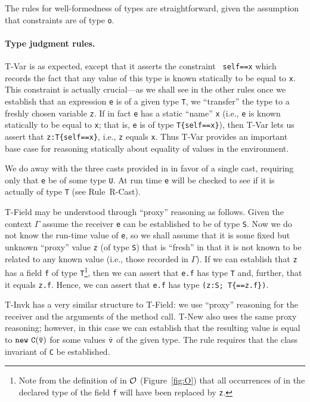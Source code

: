 The rules for well-formedness of types are straightforward, given 
the assumption that constraints are of type {\tt o}.

\paragraph{Type judgment rules.}
{\sc T-Var} is as expected, except that it asserts the constraint {\tt
self==x} which records the fact that any value of this type is known
statically to be equal to {\tt x}. This constraint is actually 
crucial---as we shall see in the other rules once we establish that
an expression {\tt e} is of a given type {\tt T}, we ``transfer'' the
type to a freshly chosen variable {\tt z}. If in fact {\tt e} has a
static ``name'' {\tt x} (i.e., {\tt e} is known statically to be
equal to {\tt x}; that is, {\tt e} is of type {\tt T\{self==x\}}), then
{\sc T-Var} lets us assert that {\tt z:T\{self==x\}}, i.e., {\tt z}
equals {\tt x}. Thus {\sc T-Var} provides an important base case for
reasoning statically about equality of values in the environment.

We do away with the three casts provided in \FJ{} in favor of a single
cast, requiring only that {\tt e} be of some type {\tt U}. At run time
{\tt e} will be checked to see if it is actually of type {\tt T} (see
Rule~{\sc R-Cast}).

{\sc T-Field} may be understood through ``proxy'' reasoning as
follows.  Given the context $\Gamma$ assume the receiver {\tt e} can
be established to be of type {\tt S}. Now we do not know the run-time
value of {\tt e}, so we shall assume that it is some fixed but unknown
``proxy'' value {\tt z} (of type {\tt S}) that is ``fresh'' in that it
is not known to be related to any known value (i.e., those recorded
in $\Gamma$).  If we can establish that {\tt z} has a field {\tt f} of
type {\tt T}\footnote{Note from the definition of \fields{} in
${\cal O}$ (Figure~\ref{fig:O}) that all occurrences of \this{}
in the declared type of the field {\tt f} will have been
replaced by {\tt z}.}, then we can assert that {\tt e.f} has
type {\tt T} and, further, that it equals {\tt z.f}.  Hence, we
can assert that {\tt e.f} has type {\tt (z:S;\,T\{\self==z.f\})}.

{\sc T-Invk} has a very similar structure to {\sc T-Field}: we use
``proxy'' reasoning for the receiver and the arguments of the method
call. {\sc T-New} also uses the same proxy reasoning; however, in this case
we can establish that the resulting value is equal to ${\tt new\ C(\bar{\tt v})}$
for some values $\bar{\tt v}$ of the given type.  The rule
requires that the class invariant of {\tt C} be established.

